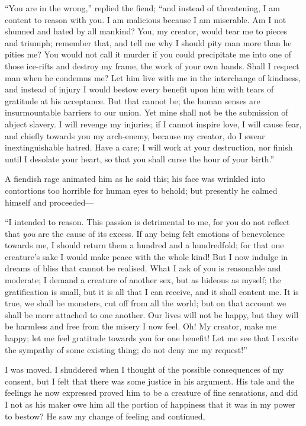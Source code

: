 \documentclass[12pt,openright]{book}
\begin{document}
“You are in the wrong,” replied the fiend; “and instead of threatening, I am content to reason with you. I am malicious because I am miserable. Am I not shunned and hated by all mankind? You, my creator, would tear me to pieces and triumph; remember that, and tell me why I should pity man more than he pities me? You would not call it murder if you could precipitate me into one of those ice-rifts and destroy my frame, the work of your own hands. Shall I respect man when he condemns me? Let him live with me in the interchange of kindness, and instead of injury I would bestow every benefit upon him with tears of gratitude at his acceptance. But that cannot be; the human senses are insurmountable barriers to our union. Yet mine shall not be the submission of abject slavery. I will revenge my injuries; if I cannot inspire love, I will cause fear, and chiefly towards you my arch-enemy, because my creator, do I swear inextinguishable hatred. Have a care; I will work at your destruction, nor finish until I desolate your heart, so that you shall curse the hour of your birth.”

A fiendish rage animated him as he said this; his face was wrinkled into contortions too horrible for human eyes to behold; but presently he calmed himself and proceeded—

“I intended to reason. This passion is detrimental to me, for you do not reflect that \textit{you} are the cause of its excess. If any being felt emotions of benevolence towards me, I should return them a hundred and a hundredfold; for that one creature’s sake I would make peace with the whole kind! But I now indulge in dreams of bliss that cannot be realised. What I ask of you is reasonable and moderate; I demand a creature of another sex, but as hideous as myself; the gratification is small, but it is all that I can receive, and it shall content me. It is true, we shall be monsters, cut off from all the world; but on that account we shall be more attached to one another. Our lives will not be happy, but they will be harmless and free from the misery I now feel. Oh! My creator, make me happy; let me feel gratitude towards you for one benefit! Let me see that I excite the sympathy of some existing thing; do not deny me my request!”

I was moved. I shuddered when I thought of the possible consequences of my consent, but I felt that there was some justice in his argument. His tale and the feelings he now expressed proved him to be a creature of fine sensations, and did I not as his maker owe him all the portion of happiness that it was in my power to bestow? He saw my change of feeling and continued,
\end{document}
